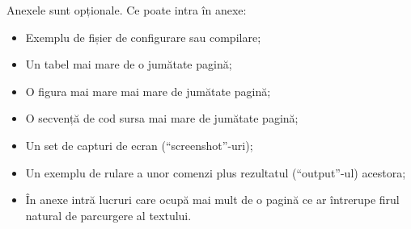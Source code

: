 \documentclass[12pt,a4paper]{report}
\begin{document}
Anexele sunt opționale.
Ce poate intra în anexe:
\begin{itemize}
\item	Exemplu de fișier de configurare sau compilare;
\item	Un tabel mai mare de o jumătate pagină;
\item	O figura mai mare mai mare de jumătate pagină;
\item	O secvență de cod sursa mai mare de jumătate pagină;
\item	Un set de capturi de ecran (``screenshot''-uri);
\item	Un exemplu de rulare a unor comenzi plus rezultatul (``output''-ul) acestora;
\item 	În anexe intră lucruri care ocupă mai mult de o pagină ce ar întrerupe firul natural de parcurgere al textului.
\end{itemize}
\end{document}
